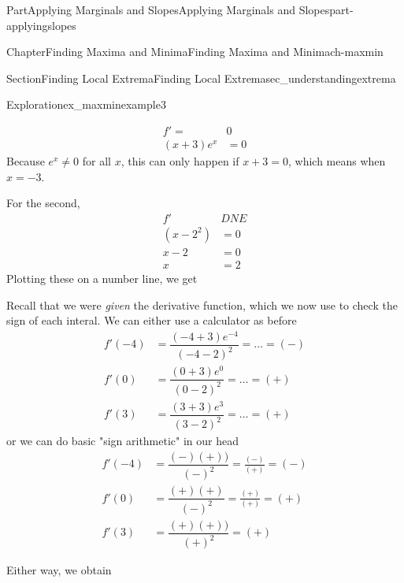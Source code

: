 \documentclass{tufte-book}
\numberwithin{equation}{chapter}
\newcommand{\amp}{&}
\begin{document}
\begin{partptx}{Part}{Applying Marginals and Slopes}{}{Applying Marginals and Slopes}{}{}{part-applyingslopes}
\begin{chapterptx}{Chapter}{Finding Maxima and Minima}{}{Finding Maxima and Minima}{}{}{ch-maxmin}
\begin{sectionptx}{Section}{Finding Local Extrema}{}{Finding Local Extrema}{}{}{sec_understandingextrema}
\begin{exploration}{Exploration}{}{ex_maxminexample3}
\begin{enumerate}[font=\bfseries,label=(\alph*),ref=\alph*]
\begin{align*}
f' = \amp 0\\
(x+3)e^x \amp =0
\end{align*}
Because \(e^x \neq 0\) for all \(x\), this can only happen if \(x+3=0\), which means when \(x=-3\).%
\par
For the second,%
\begin{align*}
f' \amp DNE \\
(x-2^2) \amp =0 \\
x-2 \amp =0\\
x \amp = 2
\end{align*}
Plotting these on a number line, we get \begin{image}{0}{1}{0}{}%
%
\end{image}%
%
\par
Recall that we were \emph{given} the derivative function, which we now use to check the sign of each interal. We can either use a calculator as before%
\begin{align*}
f'(-4) \amp  = \dfrac{(-4+3)e^{-4}}{(-4-2)^2} = \dots = (-)\\
f'(0) \amp = \dfrac{(0+3)e^0}{(0-2)^2} = \dots = (+)\\
f'(3) \amp = \dfrac{(3+3)e^3}{(3-2)^2} = \dots = (+)
\end{align*}
or we can do basic "sign arithmetic" in our head%
\begin{align*}
f'(-4) \amp  = \dfrac{(-)(+))}{(-)^2} = \frac{(-)}{(+)} =  (-)\\
f'(0) \amp = \dfrac{(+)(+)}{(-)^2} = \frac{(+)}{(+)} = (+)\\
f'(3) \amp = \dfrac{(+)(+))}{(+)^2} = (+)
\end{align*}
%
\par
Either way, we obtain \begin{image}{0}{1}{0}{}%
\end{image}
\end{enumerate}
\end{exploration}
\end{sectionptx}
\end{chapterptx}
\end{partptx}
\end{document}
